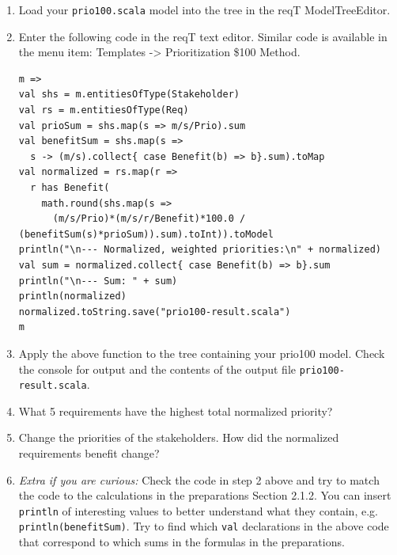 \documentclass[11pt]{article}
\begin{document}
\begin{framed}
\begin{enumerate}
\item Load your \verb+prio100.scala+ model into the tree in the reqT ModelTreeEditor.
\item Enter the following code in the reqT text editor. Similar code is available in the menu item:  Templates -> Prioritization \$100 Method.
\begin{lstlisting}
m =>    
val shs = m.entitiesOfType(Stakeholder)
val rs = m.entitiesOfType(Req)
val prioSum = shs.map(s => m/s/Prio).sum
val benefitSum = shs.map(s => 
  s -> (m/s).collect{ case Benefit(b) => b}.sum).toMap
val normalized = rs.map(r => 
  r has Benefit(
    math.round(shs.map(s => 
      (m/s/Prio)*(m/s/r/Benefit)*100.0 / (benefitSum(s)*prioSum)).sum).toInt)).toModel
println("\n--- Normalized, weighted priorities:\n" + normalized)
val sum = normalized.collect{ case Benefit(b) => b}.sum
println("\n--- Sum: " + sum)
println(normalized)
normalized.toString.save("prio100-result.scala")
m 
\end{lstlisting}
\item Apply the above function to the tree containing your prio100 model. Check the console for output and the contents of the output file \Verb+prio100-result.scala+.
\item What 5 requirements have the highest total normalized priority?
\vspace{4em}
\item Change the priorities of the stakeholders. How did the normalized requirements benefit change?
\vspace{3em}
\item {\it Extra if you are curious:} Check the code in step 2 above and try to match the code to the calculations in the preparations Section 2.1.2. You can insert \verb+println+ of interesting values to better understand what they contain, e.g. \verb+println(benefitSum)+. Try to find which {\verb+val+} declarations in the above code that correspond to which sums in the formulas in the preparations. 

\end{enumerate}
\end{framed}
\end{document}
